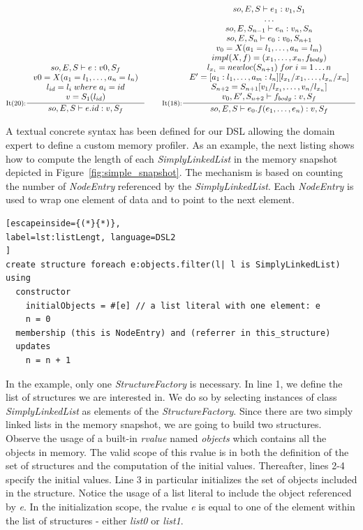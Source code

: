 \[
\inference[It(20):]{
so,E,S|-e:v0,S_f \\
v0 = X(a_1=l_1, \dots, a_n=l_n) \\
l_{id} = l_i \; where \; a_i = id \\
v = S_1(l_{id}) \\
}
{so,E,S|-e.id:v,S_f}
\quad\quad
\inference[It(18):]{
so,E,S|-e_1:v_1,S_1 \\
\ldots \\
so,E,S_{n-1}|-e_n:v_n,S_n \\
so,E,S_n|-e_0:v_0,S_{n+1} \\
v_0 = X(a_1=l_1, \dots, a_n=l_m) \\
impl(X,f) = (x_1, \dots, x_n, f_{body}) \\
l_{x_i} = newloc(S_{n+1}) \; for \; i = 1 \dots n \\
E' = [a_1:l_1, \dots, a_m:l_n][l_{x_1}/x_1, \dots, l_{x_n}/x_n] \\
S_{n+2} = S_{n+1}[v_1/l_{x_1}, \dots, v_n/l_{x_n}] \\
v_0, E', S_{n+2}|-f_{body}:v,S_f
}
{so,E,S|-e_0.f(e_1, \ldots, e_n):v,S_f}
\]



A textual concrete syntax has been defined for our DSL allowing the domain expert to define a custom memory profiler.
As an example, the next listing shows how to compute the length of each \textit{SimplyLinkedList} in the memory snapshot depicted in Figure~\ref{fig:simple_snapshot}.
The mechanism is based on counting the number of \textit{NodeEntry} referenced by the \textit{SimplyLinkedList}.
Each \textit{NodeEntry} is used to wrap one element of data and to point to the next element.

\begin{lstlisting}[escapeinside={(*}{*)}, 
label=lst:listLengt, language=DSL2
]
create structure foreach e:objects.filter(l| l is SimplyLinkedList) using
  constructor
    initialObjects = #[e] // a list literal with one element: e
    n = 0
  membership (this is NodeEntry) and (referrer in this_structure)
  updates 
    n = n + 1
\end{lstlisting}

In the example, only one \textit{StructureFactory} is necessary.
In line 1, we define the list of structures we are interested in.
We do so by selecting instances of class \textit{SimplyLinkedList} as elements of the \textit{StructureFactory}.
Since there are two simply linked lists in the memory snapshot, we are going to build two structures.
Observe the usage of a built-in \textit{rvalue} named \textit{objects} which contains all the objects in memory.
The valid scope of this rvalue is in both the definition of the set of structures and the computation of the initial values.
Thereafter, lines 2-4 specify the initial values.
Line 3 in particular initializes the set of objects included in the structure.
Notice the usage of a list literal to include the object referenced by \textit{e}.
In the initialization scope, the rvalue \textit{e} is equal to one of the element within the list of structures - either \textit{list0} or \textit{list1}.

